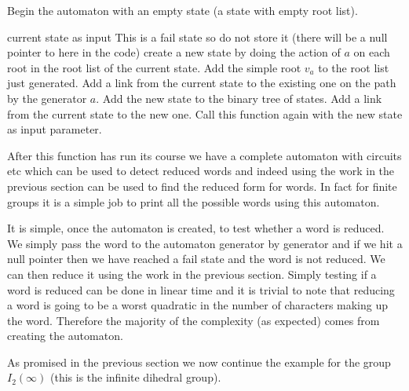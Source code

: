 \documentclass[a4paper,12pt]{article}
\begin{document}
Begin the automaton with an empty state (a state with empty root list).

\begin{algorithmic}[1]
	\REQUIRE current state as input
			\STATE This is a fail state so do not store it (there will be a null pointer to here in the code)
		\ELSE
			\STATE create a new state by doing the action of $a$ on each root in the root list of the current state.
			\STATE Add the simple root $v_a$ to the root list just generated.
				\STATE Add a link from the current state to the existing one on the path by the generator $a$.
			\ELSE
				\STATE Add the new state to the binary tree of states.
				\STATE Add a link from the current state to the new one.
				\STATE Call this function again with the new state as input parameter.
			\ENDIF
		\ENDIF
	\ENDFOR
\end{algorithmic}

After this function has run its course we have a complete automaton with circuits etc which can be used to detect reduced words and indeed using the work in the previous section can be used to find the reduced form for words. In fact for finite groups it is a simple job to print all the possible words using this automaton.

It is simple, once the automaton is created, to test whether a word is reduced. We simply pass the word to the automaton generator by generator and if we hit a null pointer then we have reached a fail state and the word is not reduced. We can then reduce it using the work in the previous section. Simply testing if a word is reduced can be done in linear time and it is trivial to note that reducing a word is going to be a worst quadratic in the number of characters making up the word. Therefore the majority of the complexity (as expected) comes from creating the automaton.

As promised in the previous section we now continue the example for the group $I_2(\infty)$ (this is the infinite dihedral group).
\end{document}
